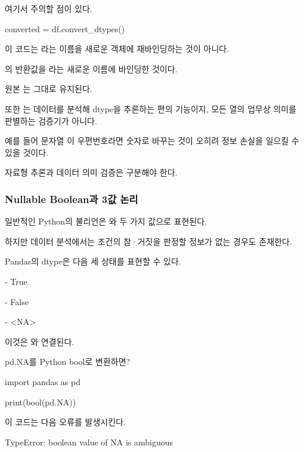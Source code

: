여기서 주의할 점이 있다.

\begin{dhkcode}
converted = df.convert_dtypes()
\end{dhkcode}

이 코드는 라는 이름을 새로운 객체에 재바인딩하는 것이 아니다.

의 반환값을 라는 새로운 이름에 바인딩한 것이다.

원본 는 그대로 유지된다.

또한 는 데이터를 분석해 dtype을 추론하는 편의 기능이지, 모든 열의 업무상 의미를 판별하는 검증기가 아니다.

예를 들어 문자열 이 우편번호라면 숫자로 바꾸는 것이 오히려 정보 손실을 일으킬 수 있을 것이다.

자료형 추론과 데이터 의미 검증은 구분해야 한다.

\subsubsection{Nullable Boolean과 3값 논리}

일반적인 Python의 불리언은 와  두 가지 값으로 표현된다.

하지만 데이터 분석에서는 조건의 참·거짓을 판정할 정보가 없는 경우도 존재한다.

Pandas의  dtype은 다음 세 상태를 표현할 수 있다.

\begin{dhksmry}
    - True

    - False

    - <NA>
\end{dhksmry}

이것은 와 연결된다.

\begin{dhknote}
\begin{dhksmry}[centered]
pd.NA를 Python bool로 변환하면?
\end{dhksmry}
\end{dhknote}

\begin{dhkcode}
import pandas as pd

print(bool(pd.NA))
\end{dhkcode}

이 코드는 다음 오류를 발생시킨다.

\begin{dhkzsh}
TypeError: boolean value of NA is ambiguous
\end{dhkzsh}

